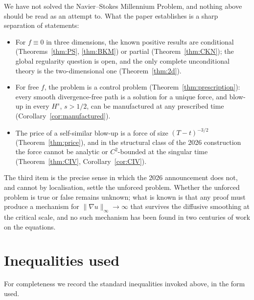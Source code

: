 \documentclass[11pt]{article}
\theoremstyle{remark}
\newcommand{\norm}[1]{\lVert #1\rVert}
\begin{document}
We have not solved the Navier--Stokes Millennium Problem, and nothing above should be read as
an attempt to. What the paper establishes is a sharp separation of statements:
\begin{itemize}[leftmargin=*]
\item For $f\equiv0$ in three dimensions, the known positive results are conditional
      (Theorems~\ref{thm:PS}, \ref{thm:BKM}) or partial (Theorem~\ref{thm:CKN}); the global
      regularity question is open, and the only complete unconditional theory is the
      two-dimensional one (Theorem~\ref{thm:2d}).
\item For free $f$, the problem is a control problem (Theorem~\ref{thm:prescription}): every
      smooth divergence-free path is a solution for a unique force, and blow-up in every $H^s$,
      $s>1/2$, can be manufactured at any prescribed time
      (Corollary~\ref{cor:manufactured}).
\item The price of a self-similar blow-up is a force of size $(T-t)^{-3/2}$
      (Theorem~\ref{thm:price}), and in the structural class of the 2026 construction the force
      cannot be analytic or $C^2$-bounded at the singular time (Theorem~\ref{thm:CIV},
      Corollary~\ref{cor:CIV}).
\end{itemize}
The third item is the precise sense in which the 2026 announcement does not, and cannot by
localisation, settle the unforced problem. Whether the unforced problem is true or false
remains unknown; what is known is that any proof must produce a mechanism for
$\norm{\nabla u}_\infty\to\infty$ that survives the diffusive smoothing at the critical scale,
and no such mechanism has been found in two centuries of work on the equations.

\appendix

\section{Inequalities used}\label{app:ineq}

For completeness we record the standard inequalities invoked above, in the form used.
\end{document}
